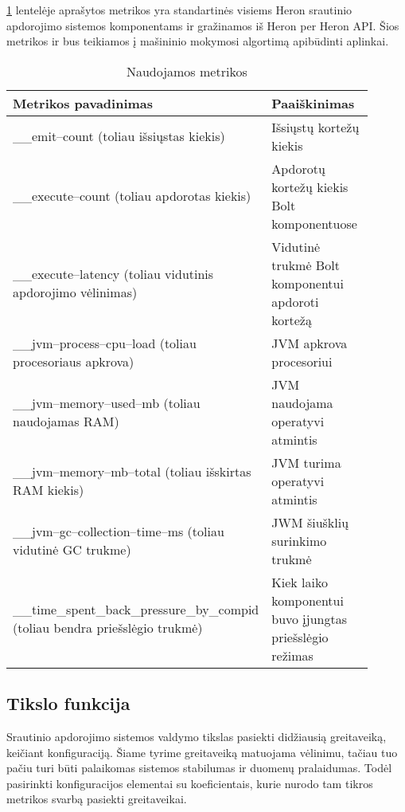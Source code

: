 \documentclass{VUMIFPSbakalaurinis}
\begin{document}
\ref{metrics–table} lentelėje aprašytos metrikos yra standartinės visiems Heron srautinio apdorojimo sistemos komponentams ir gražinamos iš Heron per Heron API. Šios metrikos ir bus teikiamos į mašininio mokymosi algortimą apibūdinti aplinkai.

\begin{longtable}{|p{0.5\linewidth}|p{0.4\linewidth}|}
    \caption{Naudojamos metrikos}
    \label{metrics–table}\\
    \hline
    \rowcolor[HTML]{C0C0C0} 
    Metrikos pavadinimas                                  & Paaiškinimas            \\ \hline
    \endfirsthead
    \endhead
    \_\_emit–count (toliau išsiųstas kiekis)                           & Išsiųstų kortežų kiekis                    \\ \hline
    \_\_execute–count  (toliau apdorotas kiekis)                       & Apdorotų kortežų kiekis Bolt komponentuose \\ \hline
    \_\_execute–latency  (toliau vidutinis apdorojimo vėlinimas)       & Vidutinė trukmė Bolt komponentui apdoroti kortežą                                          \\ \hline
    \_\_jvm–process–cpu–load  (toliau procesoriaus apkrova)            & JVM apkrova procesoriui     \\ \hline
    \_\_jvm–memory–used–mb    (toliau naudojamas RAM)                  & JVM naudojama operatyvi atmintis       \\ \hline
    \_\_jvm–memory–mb–total     (toliau išskirtas RAM kiekis)          & JVM turima operatyvi atmintis    \\ \hline
    \_\_jvm–gc–collection–time–ms  (toliau vidutinė GC trukme)         & JWM šiušklių surinkimo trukmė     \\ \hline
    \_\_time\_spent\_back\_pressure\_by\_compid  (toliau bendra priešslėgio trukmė)  & Kiek laiko komponentui buvo įjungtas priešslėgio režimas  \\ \hline
\end{longtable}

\subsection{Tikslo funkcija}

Srautinio apdorojimo sistemos valdymo tikslas pasiekti didžiausią greitaveiką, keičiant konfiguraciją. Šiame tyrime greitaveiką matuojama vėlinimu, tačiau tuo pačiu turi būti palaikomas sistemos stabilumas ir duomenų pralaidumas. Todėl pasirinkti konfiguracijos elementai su koeficientais, kurie nurodo tam tikros metrikos svarbą pasiekti greitaveikai. 
\end{document}

